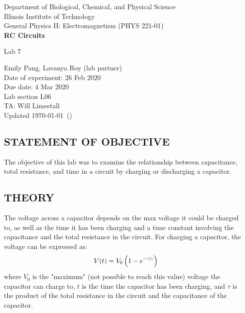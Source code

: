 \documentclass [12pt, letterpaper, twoside] {article}
\begin{document}
\begin {titlepage}
\begin {center}
Department of Biological, Chemical, and Physical Science\\
\vspace {0.1cm}
Illinois Institute of Technology\\
\vspace {0.1cm}
General Physics II: Electromagnetism (PHYS 221-01)\\
\vspace* {\fill}
\begingroup
\Large
\textbf {RC Circuits}
\vspace {0.35cm}

\normalsize
Lab 7 
\vspace {1.5cm}
\endgroup
\vspace* {\fill}
\end {center}

\vspace*{\fill}
\begin {flushright}
\footnotesize
Emily Pang, Lavanya Roy (lab partner) \\
Date of experiment: 26 Feb 2020 \\
Due date: 4 Mar 2020 \\
Lab section L06 \\
TA: Will Limestall \\
Updated \usdate\today~(\currenttime)
\end {flushright}
\end {titlepage}
\subsection* {STATEMENT OF OBJECTIVE}
The objective of this lab was to examine the relationship between capacitance, total resistance, and time in a circuit by charging or discharging a capacitor.

\subsection* {THEORY}
The voltage across a capacitor depends on the max voltage it could be charged to, as well as the time it has been charging and a time constant involving the capacitance and the total resistance in the circuit. For charging a capacitor, the voltage can be expressed as:
\begin{equation}
  \begin{split}
    V(t) &= V_{\text{0}}\left(1-e^{-\sfrac{t}{\tau}}\right) \\
  \end{split}
\end{equation}
where \(V_{\text{0}}\) is the "maximum" (not possible to reach this value) voltage the capacitor can charge to, \(t\) is the time the capacitor has been charging, and \(\tau\) is the product of the total resistance in the circuit and the capacitance of the capacitor.
\end{document}
